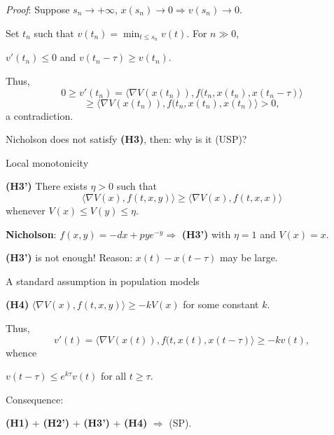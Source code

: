 \documentclass{beamer}
\begin{document}
\begin{frame}{}
\emph{Proof}: Suppose  $s_n\to +\infty$, $x(s_n)\to 0 \Longrightarrow v(s_n)\to 0$. 
\smallskip 

Set $t_n$ such that    $v(t_n) =\min_{t\le s_n} v(t)$. 
For $n\gg 0$, 
\begin{center}
    $v'(t_n)\le 0$ and  $v(t_n-\tau)\ge v(t_n)$.
\end{center}
Thus,
$$0\ge v'(t_n)=\langle \nabla V(x(t_n)),f(t_n,x(t_n),x(t_n-\tau)\rangle
$$
$$\ge \langle \nabla V(x(t_n)),f(t_n,x(t_n),x(t_n)\rangle >0,$$  a contradiction. 
\medskip 
\pause 


Nicholson does not satisfy {\bf (H3)}, then: why is it (USP)?

\end{frame}    
\begin{frame}{Local monotonicity}

{\bf (H3')} There exists $\eta >0$ such that
$$\langle \nabla V(x),f(t,x,y)\rangle \ge \langle \nabla V(x),f(t,x,x)\rangle$$
whenever $V(x)\le V(y)\le \eta$. 

    \bigskip 
{\bf    Nicholson}: $f(x,y)= -dx + pye^{-y} \Longrightarrow$  {\bf (H3')} with $\eta=1$ and $V(x)=x$. 

\bigskip 
\pause 

{\bf (H3')} is not enough! Reason: $x(t)-x(t-\tau)$ may be large.  

\end{frame}

\begin{frame}{A standard assumption in population models}

    {\bf (H4)} 
$\langle \nabla V(x),f(t,x,y)\rangle \ge -k V(x) $ for some constant $k$. 
\medskip{}

Thus, 
$$v'(t)= 
\langle \nabla V(x(t)), f(t,x(t),x(t-\tau)\rangle \ge -kv(t),
$$
whence
\begin{center}
    $v(t-\tau) \le e^{k\tau}v(t)$ for all $t\ge \tau$.
\end{center}
\medskip 

Consequence:  

\begin{center}
        {\bf (H1)} +     {\bf (H2')} +     {\bf (H3')} +     {\bf (H4)} $\Longrightarrow$ (SP). 
\end{center}    
 
 
 

\end{frame}
\end{document}
